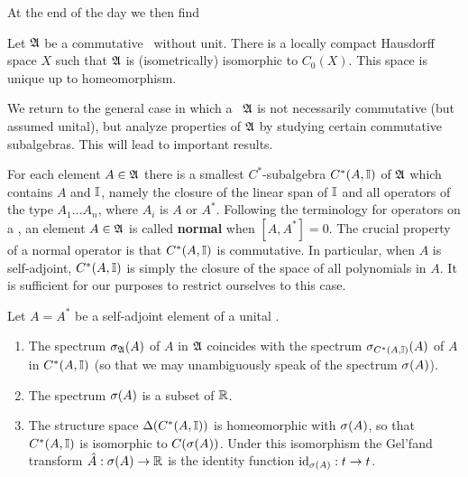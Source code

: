 At the end of the day we then find
\begin{Theorem} Let ${\frak A}$ be a commutative \ca\ without
unit. There is a locally compact Hausdorff space $X$ such that ${\frak A}$ is
(isometrically) isomorphic to $C_0(X)$. This space is unique up to
homeomorphism. \end{Theorem}  We return to the general case in which a \ca\ ${\frak A}$
is not necessarily commutative (but assumed unital), but analyze
properties of ${\frak A}$ by studying certain commutative subalgebras.  This
will lead to important results.

For each element $A\in{\frak A}$ there is a smallest $C^*$-subalgebra
$C^*(A,{\Bbb I})$ of ${\frak A}$ which contains $A$ and ${\Bbb I}$, namely the closure of
the linear span of ${\Bbb I}$ and all operators of the type $A_1\ldots A_n$,
where $A_i$ is $A$ or $A^*$.  Following the terminology for operators
on a \Hs, an element $A\in{\frak A}$ is called {\bf normal} when
$[A,A^*]=0$. The crucial property of a normal operator is that
$C^*(A,{\Bbb I})$ is commutative. In particular, when $A$ is self-adjoint,
$C^*(A,{\Bbb I})$ is simply the closure of the space of all polynomials in
$A$.  It is sufficient for our purposes to restrict ourselves to this
case.
\begin{Theorem}
Let $A=A^*$ be a self-adjoint element of a unital \ca.
\begin{enumerate}
\item
The spectrum $\sigma_{{\frak A}}(A)$ of $A$ in ${\frak A}$ coincides with the spectrum
$\sigma_{C^*(A,{\Bbb I})}(A)$ of $A$ in $C^*(A,{\Bbb I})$ (so that we may
unambiguously speak of the spectrum $\sigma(A)$).
\item
The spectrum $\sigma(A)$ is a subset of ${\Bbb R}$.
\item
The structure space $\Delta(C^*(A,{\Bbb I}))$ is homeomorphic with $\sigma(A)$, so
that $C^*(A,{\Bbb I})$ is isomorphic to $C(\sigma(A))$. Under this isomorphism
the Gel'fand transform $\hat{A}:\sigma(A)\rightarrow{\Bbb R}$ is the identity function
${\rm id}_{\sigma(A)}:t\rightarrow t$.
\end{enumerate} \end{Theorem}

